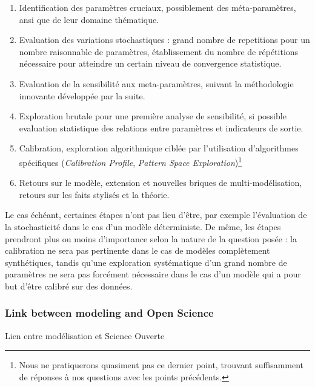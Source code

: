 \begin{enumerate}
	\item Identification des paramètres cruciaux, possiblement des méta-paramètres, ansi que de leur domaine thématique. 
	\item Evaluation des variations stochastiques : grand nombre de repetitions pour un nombre raisonnable de paramètres, établissement du nombre de répétitions nécessaire pour atteindre un certain niveau de convergence statistique.
	\item Evaluation de la sensibilité aux meta-paramètres, suivant la méthodologie innovante développée par la suite.
	\item Exploration brutale pour une première analyse de sensibilité, si possible evaluation statistique des relations entre paramètres et indicateurs de sortie.
	\item Calibration, exploration algorithmique ciblée par l'utilisation d'algorithmes spécifiques (\emph{Calibration Profile}, \emph{Pattern Space Exploration})\footnote{Nous ne pratiquerons quasiment pas ce dernier point, trouvant suffisamment de réponses à nos questions avec les points précédents.}
	\item Retours sur le modèle, extension et nouvelles briques de multi-modélisation, retours sur les faits stylisés et la théorie.
\end{enumerate}

Le cas échéant, certaines étapes n'ont pas lieu d'être, par exemple l'évaluation de la stochasticité dans le cas d'un modèle déterministe. De même, les étapes prendront plus ou moins d'importance selon la nature de la question posée : la calibration ne sera pas pertinente dans le cas de modèles complètement synthétiques, tandis qu'une exploration systématique d'un grand nombre de paramètres ne sera pas forcément nécessaire dans le cas d'un modèle qui a pour but d'être calibré sur des données.



\subsubsection{Link between modeling and Open Science}{Lien entre modélisation et Science Ouverte}





